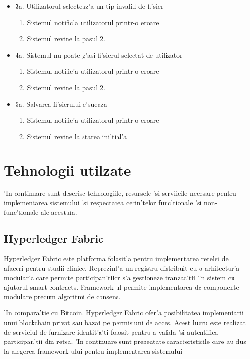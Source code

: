\documentclass[12pt,a4paper,twoside]{report}
\begin{document}
\begin{itemize}
    \item 3a. Utilizatorul selecteaz'a un tip invalid de fi'sier
        \begin{enumerate}
            \item Sistemul notific'a utilizatorul printr-o eroare
            \item Sistemul revine la pasul 2.
        \end{enumerate}
    \item 4a. Sistemul nu poate g'asi fi'sierul selectat de utilizator
        \begin{enumerate}
            \item Sistemul notific'a utilizatorul printr-o eroare
            \item Sistemul revine la pasul 2.
        \end{enumerate}
    \item 5a. Salvarea fi'sierului e'sueaza
        \begin{enumerate}
            \item Sistemul notific'a utilizatorul printr-o eroare
            \item Sistemul revine la starea ini'tial'a
        \end{enumerate}
    
\end{itemize}
\section{Tehnologii utilzate}
'In continuare sunt descrise tehnologiile, resursele 'si serviicile necesare pentru implementarea sistemului 'si respectarea cerin'telor func'tionale 'si non-func'tionale ale acestuia.
\subsection{Hyperledger Fabric}
Hyperledger Fabric este platforma folosit'a pentru implementarea retelei de afaceri pentru studii clinice. Reprezint'a un registru distribuit cu o arhitectur'a modular'a care permite participan'tilor s'a gestioneze tranzac'tii 'in sistem cu ajutorul smart contracts. Framework-ul permite implementarea de componente modulare precum algoritmi de consens. 

'In compara'tie cu Bitcoin, Hyperledger Fabric ofer'a posibilitatea implementarii unui blockchain privat sau bazat pe permisiuni de acces. Acest lucru este realizat de serviciul de furnizare identit'a'ti folosit pentru a valida 'si autentifica participan'tii din retea. 'In continuare sunt prezentate caracteristicile care au dus la alegerea framework-ului pentru implementarea sistemului.
\end{document}
